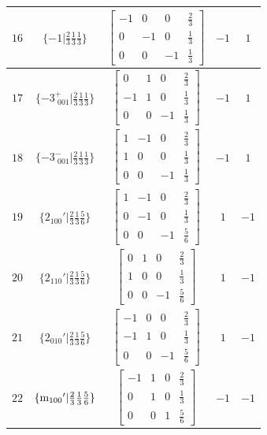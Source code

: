 \documentclass[fleqn,8pt]{jsarticle}
\begin{document}
\begin{longtable}{ccccc}
$ 16 $ & $ \{-1|\frac{2}{3} \frac{1}{3} \frac{1}{3}\} $ & $ \begin{bmatrix} -1 & 0 & 0 & \frac{2}{3} \\ 0 & -1 & 0 & \frac{1}{3} \\ 0 & 0 & -1 & \frac{1}{3} \end{bmatrix} $ & $ -1 $ & $ 1 $ \\ \hline
$ 17 $ & $ \{-3^{+}_{\,\,001}|\frac{2}{3} \frac{1}{3} \frac{1}{3}\} $ & $ \begin{bmatrix} 0 & 1 & 0 & \frac{2}{3} \\ -1 & 1 & 0 & \frac{1}{3} \\ 0 & 0 & -1 & \frac{1}{3} \end{bmatrix} $ & $ -1 $ & $ 1 $ \\ \hline
$ 18 $ & $ \{-3^{-}_{\,\,001}|\frac{2}{3} \frac{1}{3} \frac{1}{3}\} $ & $ \begin{bmatrix} 1 & -1 & 0 & \frac{2}{3} \\ 1 & 0 & 0 & \frac{1}{3} \\ 0 & 0 & -1 & \frac{1}{3} \end{bmatrix} $ & $ -1 $ & $ 1 $ \\ \hline
$ 19 $ & $ \{2{}_{100}{}'|\frac{2}{3} \frac{1}{3} \frac{5}{6}\} $ & $ \begin{bmatrix} 1 & -1 & 0 & \frac{2}{3} \\ 0 & -1 & 0 & \frac{1}{3} \\ 0 & 0 & -1 & \frac{5}{6} \end{bmatrix} $ & $ 1 $ & $ -1 $ \\ \hline
$ 20 $ & $ \{2{}_{110}{}'|\frac{2}{3} \frac{1}{3} \frac{5}{6}\} $ & $ \begin{bmatrix} 0 & 1 & 0 & \frac{2}{3} \\ 1 & 0 & 0 & \frac{1}{3} \\ 0 & 0 & -1 & \frac{5}{6} \end{bmatrix} $ & $ 1 $ & $ -1 $ \\ \hline
$ 21 $ & $ \{2{}_{010}{}'|\frac{2}{3} \frac{1}{3} \frac{5}{6}\} $ & $ \begin{bmatrix} -1 & 0 & 0 & \frac{2}{3} \\ -1 & 1 & 0 & \frac{1}{3} \\ 0 & 0 & -1 & \frac{5}{6} \end{bmatrix} $ & $ 1 $ & $ -1 $ \\ \hline
$ 22 $ & $ \{{\rm m}_{100}{}'|\frac{2}{3} \frac{1}{3} \frac{5}{6}\} $ & $ \begin{bmatrix} -1 & 1 & 0 & \frac{2}{3} \\ 0 & 1 & 0 & \frac{1}{3} \\ 0 & 0 & 1 & \frac{5}{6} \end{bmatrix} $ & $ -1 $ & $ -1 $ \\ \hline

\end{longtable}
\end{document}
